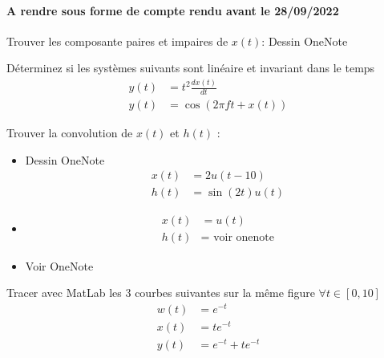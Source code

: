 \documentclass{article}
\theoremstyle{plain}%
\theoremstyle{definition}
\theoremstyle{remark}
\begin{document}
\paragraph*{A rendre sous forme de compte rendu avant le 28/09/2022}
\begin{xca}[]
    Trouver les composante paires et impaires de $ x(t) $: Dessin OneNote
\end{xca}
\begin{xca}[]
    Déterminez si les systèmes suivants sont linéaire et invariant dans le temps \begin{align}
        y(t) &= t^2 \frac{dx(t)}{dt} \\
        y(t) &= \cos (2 \pi ft + x(t))
    \end{align}
\end{xca}
\begin{xca}[]
    Trouver la convolution de $ x(t) $ et $ h(t) $ : 
    \begin{itemize}
        \item Dessin OneNote
        \begin{align*}
            x(t) &= 2 u(t-10) \\
            h(t) &= \sin (2t) u(t)
        \end{align*}
        \item \begin{align*}
            x(t) &= u(t) \\
            h(t) &=\text{ voir onenote}
        \end{align*}
        \item Voir OneNote
    \end{itemize}
\end{xca}
\begin{xca}[]
    Tracer avec MatLab les 3 courbes suivantes sur la même figure $ \forall t \in [0, 10] $ 
    \begin{align}
        w(t) &= e^{-t} \\
        x(t) &= te^{-t} \\
        y(t) &= e^{-t} + te^{-t}
    \end{align}
\end{xca}
\end{document}
